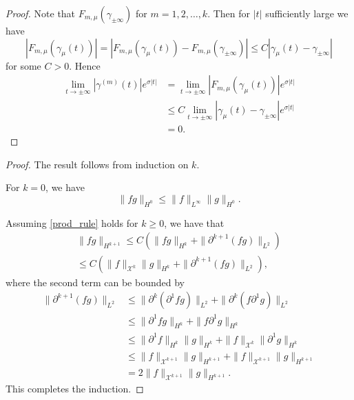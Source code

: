 \begin{proof}
	Note that \(F_{m,\mu} (\gamma_{\pm\infty})\) for \(m=1,2,\ldots, k\). Then for \(|t|\) sufficiently large we have 
	\begin{equation}
		|F_{m,\mu}(\gamma_{\mu}(t))| = |F_{m,\mu}(\gamma_{\mu}(t)) - F_{m,\mu}(\gamma_{\pm\infty})| \leq C |\gamma_\mu(t) - \gamma_{\pm\infty}|
	\end{equation}
	for some \(C> 0\). Hence
	\begin{equation}
	\begin{aligned}
		\lim_{t\to \pm\infty} |\gamma^{(m)} (t) | e^{\sigma|t|} &= \lim_{t\to\pm\infty} |F_{m,\mu}(\gamma_{\mu}(t))| e^{\sigma |t|} \\
		&\leq C \lim_{t\to\pm\infty} |\gamma_\mu(t) - \gamma_{\pm\infty}| e^{\sigma |t|} \\
		&= 0.
	\end{aligned}
	\end{equation}
	
\end{proof}

\prodruleone*
\begin{proof}
	The result follows from induction on \(k\).
	
	For \(k = 0\), we have
	\begin{equation}
		\| f g \|_{H^0} \leq \| f \|_{L^\infty} \| g\|_{H^0}.
	\end{equation}
	
	Assuming \cref{prod_rule} holds for \(k\geq 0\), we have that 
	\begin{align*}
		\| f g \|_{H^{k+1}} \leq C \left( \| f g \|_{H^k} + \| \partial^{k+1}(fg) \|_{L^2}\right) \\
		\leq C \left( \| f\|_{\mathcal X^k} \| g \|_{H^k} + \| \partial^{k+1}(fg) \|_{L^2} \right),
	\end{align*}
	where the second term can be bounded by 
	\begin{align*}
		\| \partial^{k+1}(fg) \|_{L^2} &\leq \| \partial^k(\partial^1 f g ) \|_{L^2} + \| \partial^k(f \partial^1 g) \|_{L^2} \\
		&\leq \| \partial^1 f  g \|_{H^k} + \| f \partial^1 g \|_{H^k} \\
		&\leq \| \partial^1 f \|_{H^k} \|g\|_{H^k} + \|f\|_{\mathcal X^k} \|\partial^1 g\|_{H^k} \\
		&\leq \| f \|_{\mathcal X^{k+1}} \| g\|_{H^{k+1}} + \|f \|_{\mathcal X^{k+1}} \|g\|_{H^{k+1}} \\
		&= 2  \| f \|_{\mathcal X^{k+1}} \| g\|_{H^{k+1}}.
	\end{align*}
	This completes the induction.
\end{proof}

